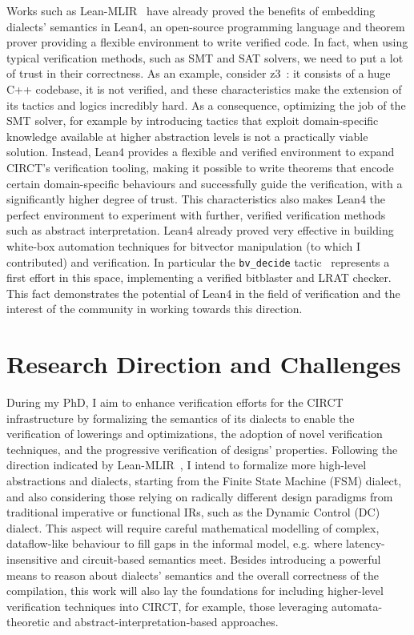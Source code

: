 \documentclass[sigconf,authorversion,nonacm, 11pt]{acmart}
\begin{document}
Works such as Lean-MLIR~\cite{bhat2024verifying} have already proved the benefits 
of embedding dialects' semantics in Lean4, an open-source programming language and theorem prover providing a flexible environment to write verified code. 
In fact, when using typical verification methods, such as SMT and SAT solvers, we need to put a lot of trust in their correctness. 
As an example, consider z3~\cite{de2008z3}: it consists of a huge C++ codebase, it is not verified, and these characteristics make the extension
of its tactics and logics incredibly hard. 
As a consequence, optimizing the job of the SMT solver, for example by introducing tactics that exploit domain-specific knowledge available at 
higher abstraction levels is not a practically viable solution. 
Instead, Lean4 provides a flexible and verified environment to expand CIRCT's verification tooling, 
making it possible to write theorems that encode certain domain-specific behaviours and successfully guide the verification, 
with a significantly higher degree of trust. 
This characteristics also makes Lean4 the perfect environment to experiment with further, verified verification 
methods such as abstract interpretation.
Lean4 already proved very effective in building white-box automation techniques for bitvector manipulation (to which I contributed)
and verification. 
In particular the \texttt{bv\_decide} tactic~\cite{bvdecide} represents a first effort in this space, implementing a verified bitblaster and 
LRAT checker. 
This fact demonstrates the potential of Lean4 in the field of verification and the interest of the community in working towards this direction. 

\section{Research Direction and Challenges}

During my PhD, I aim to enhance verification efforts for the CIRCT infrastructure by formalizing the semantics of its dialects 
to enable the verification of lowerings and optimizations, the adoption of novel verification techniques, 
and the progressive verification of designs' properties. 
Following the direction indicated by Lean-MLIR~\cite{bhat2024verifying}, I intend to formalize more high-level abstractions and dialects, 
starting from the Finite State Machine (FSM) dialect, and also considering those relying on radically different design paradigms 
from traditional imperative or functional IRs, such as the Dynamic Control (DC) dialect. 
This aspect will require careful mathematical modelling of complex, dataflow-like behaviour to fill gaps in the informal model, e.g. where latency-insensitive and 
circuit-based semantics meet. 
Besides introducing a powerful means to reason about dialects' semantics and the overall correctness of the compilation, 
this work will also lay the foundations for including higher-level verification techniques into CIRCT, for example, those leveraging automata-theoretic 
and abstract-interpretation-based approaches. 
\end{document}
